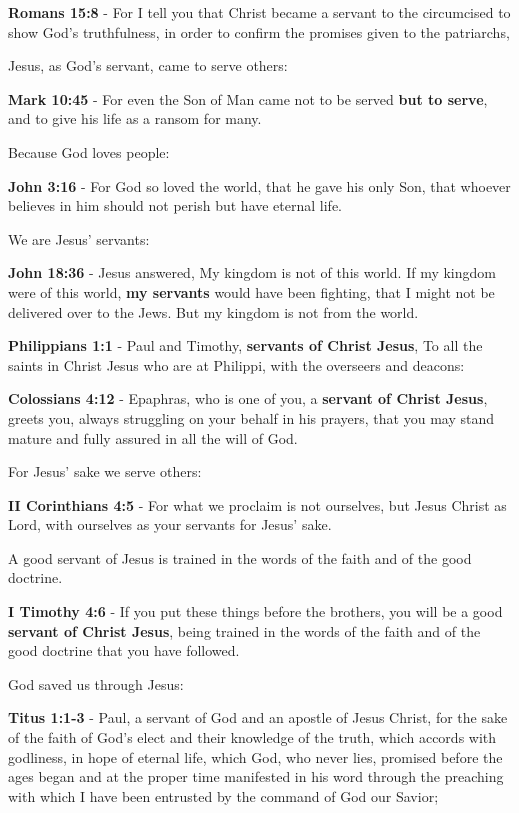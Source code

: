 \documentclass[11pt]{article}
\begin{document}
\textbf{Romans 15:8} - For I tell you that Christ became a servant to the circumcised to show God's truthfulness, in order to confirm the promises given to the patriarchs,

Jesus, as God's servant, came to serve others:

\textbf{Mark 10:45} - For even the Son of Man came not to be served \textbf{but to serve}, and to give his life as a ransom for many.

Because God loves people:

\textbf{John 3:16} - For God so loved the world, that he gave his only Son, that whoever believes in him should not perish but have eternal life.

We are Jesus' servants:

\textbf{John 18:36} - Jesus answered, My kingdom is not of this world. If my kingdom were of this world, \textbf{my servants} would have been fighting, that I might not be delivered over to the Jews. But my kingdom is not from the world.

\textbf{Philippians 1:1} - Paul and Timothy, \textbf{servants of Christ Jesus}, To all the saints in Christ Jesus who are at Philippi, with the overseers and deacons:

\textbf{Colossians 4:12} - Epaphras, who is one of you, a \textbf{servant of Christ Jesus}, greets you, always struggling on your behalf in his prayers, that you may stand mature and fully assured in all the will of God.

For Jesus' sake we serve others:

\textbf{II Corinthians 4:5} - For what we proclaim is not ourselves, but Jesus Christ as Lord, with ourselves as your servants for Jesus' sake.

A good servant of Jesus is trained in the words of the faith and of the good doctrine.

\textbf{I Timothy 4:6} - If you put these things before the brothers, you will be a good \textbf{servant of Christ Jesus}, being trained in the words of the faith and of the good doctrine that you have followed.

God saved us through Jesus:

\textbf{Titus 1:1-3} - Paul, a servant of God and an apostle of Jesus Christ, for the sake of the faith of God's elect and their knowledge of the truth, which accords with godliness, in hope of eternal life, which God, who never lies, promised before the ages began and at the proper time manifested in his word through the preaching with which I have been entrusted by the command of God our Savior;
\end{document}
